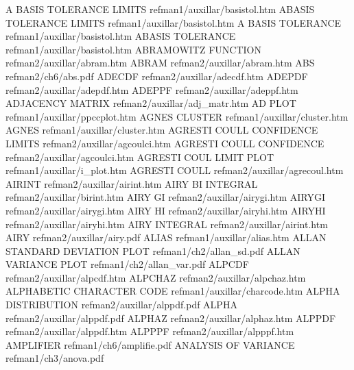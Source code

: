 A BASIS TOLERANCE LIMITS                refman1/auxillar/basistol.htm
ABASIS TOLERANCE LIMITS                 refman1/auxillar/basistol.htm
A BASIS TOLERANCE                       refman1/auxillar/basistol.htm
ABASIS TOLERANCE                        refman1/auxillar/basistol.htm
ABRAMOWITZ FUNCTION                     refman2/auxillar/abram.htm
ABRAM                                   refman2/auxillar/abram.htm
ABS                                     refman2/ch6/abs.pdf
ADECDF                                  refman2/auxillar/adecdf.htm
ADEPDF                                  refman2/auxillar/adepdf.htm
ADEPPF                                  refman2/auxillar/adeppf.htm
ADJACENCY MATRIX                        refman2/auxillar/adj_matr.htm
AD PLOT                                 refman1/auxillar/ppccplot.htm
AGNES CLUSTER                           refman1/auxillar/cluster.htm
AGNES                                   refman1/auxillar/cluster.htm
AGRESTI COULL CONFIDENCE LIMITS         refman2/auxillar/agcoulci.htm
AGRESTI COULL CONFIDENCE                refman2/auxillar/agcoulci.htm
AGRESTI COUL LIMIT PLOT                 refman1/auxillar/i_plot.htm
AGRESTI COULL                           refman2/auxillar/agrecoul.htm
AIRINT                                  refman2/auxillar/airint.htm
AIRY BI INTEGRAL                        refman2/auxillar/birint.htm
AIRY GI                                 refman2/auxillar/airygi.htm
AIRYGI                                  refman2/auxillar/airygi.htm
AIRY HI                                 refman2/auxillar/airyhi.htm
AIRYHI                                  refman2/auxillar/airyhi.htm
AIRY INTEGRAL                           refman2/auxillar/airint.htm
AIRY                                    refman2/auxillar/airy.pdf
ALIAS                                   refman1/auxillar/alias.htm
ALLAN STANDARD DEVIATION PLOT           refman1/ch2/allan_sd.pdf
ALLAN VARIANCE PLOT                     refman1/ch2/allan_var.pdf
ALPCDF                                  refman2/auxillar/alpcdf.htm
ALPCHAZ                                 refman2/auxillar/alpchaz.htm
ALPHABETIC CHARACTER CODE               refman1/auxillar/charcode.htm
ALPHA DISTRIBUTION                      refman2/auxillar/alppdf.pdf
ALPHA                                   refman2/auxillar/alppdf.pdf
ALPHAZ                                  refman2/auxillar/alphaz.htm
ALPPDF                                  refman2/auxillar/alppdf.htm
ALPPPF                                  refman2/auxillar/alpppf.htm
AMPLIFIER                               refman1/ch6/amplifie.pdf
ANALYSIS OF VARIANCE                    refman1/ch3/anova.pdf
